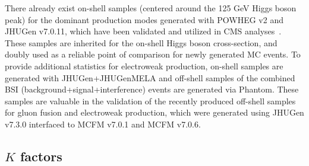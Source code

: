 			
			

There already exist on-shell samples (centered around the 125 GeV Higgs boson peak) for the dominant production modes generated with POWHEG v2 and JHUGen v7.0.11, which have been validated and utilized in CMS analyses~\cite{Sirunyan:2019twz, Sirunyan:2021rug, Sirunyan:2765059}. These samples are inherited for the on-shell Higgs boson cross-section, and doubly used as a reliable point of comparison for newly generated MC events. To provide additional statistics for electroweak production, on-shell samples are generated with JHUGen+JHUGenMELA and off-shell samples of the combined BSI (background+signal+interference) events are generated via Phantom. These samples are valuable in the validation of the recently produced off-shell samples for gluon fusion and electroweak production, which were generated using JHUGen v7.3.0 interfaced to MCFM v7.0.1 and MCFM v7.0.6. 

\subsection{$K$ factors}

